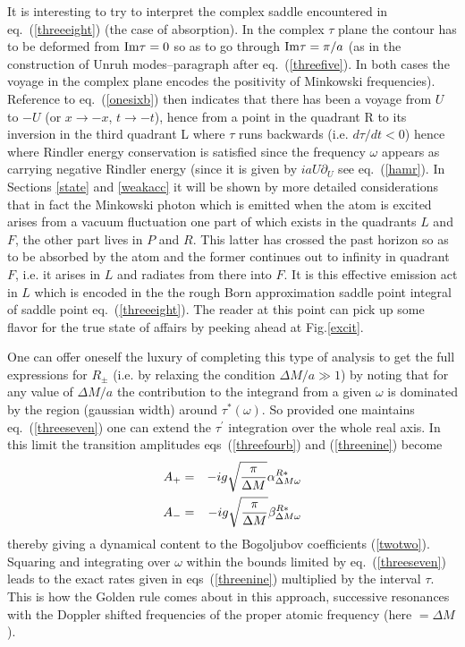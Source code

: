 \documentclass[12pt,oneside]{report}
\def\om{\omega	}
\begin{document}
It is interesting to try to interpret the complex saddle encountered in
eq.~(\ref{threeeight}) (the case of absorption).  In
the complex $\tau$ plane the contour has to be deformed from ${\rm Im} \tau =0$
so as to go through ${\rm Im} \tau =\pi / a$ (as in the construction of Unruh
modes--paragraph after eq.~(\ref{threefive}). In both cases the voyage in
the complex plane encodes the positivity of Minkowski frequencies). Reference to
eq.~(\ref{onesixb}) then indicates that there has been a voyage from $U$ to
$-U$ (or $x\to -x$, $t\to -t$), hence from a point in the quadrant R to its
inversion in the third quadrant L where $\tau$ runs backwards (i.e. 
$d\tau / dt < 0$) hence where Rindler energy conservation is satisfied
since the frequency $\om$ appears as carrying negative Rindler energy
(since it is given by $i aU \partial_U$ see eq.~(\ref{hamr}). 
In  Sections \ref{state} and \ref{weakacc}
it will be shown by more detailed considerations that in fact the Minkowski
photon which is emitted when the atom is excited arises from a vacuum
fluctuation one part of which exists in the quadrants $L$ and $F$, the other
part lives in $P$ and $R$. This latter has crossed the past horizon so as to be
absorbed by the atom and the former continues out to infinity in quadrant $F$,
i.e. it arises in $L$ and radiates from there into $F$. It is this effective
emission act in $L$ which is encoded in the the rough Born approximation saddle
point integral of saddle point eq.~(\ref{threeeight}). The reader at this point
can pick up some flavor for the true state of affairs by peeking ahead at
Fig.\ref{excit}.

One  can offer oneself the luxury of completing this type of analysis to get the
full expressions for $R_\pm$ (i.e. by relaxing the condition 
$\Delta M/ a \gg  1$) 
by noting that for any value of $\Delta M / a$ the
contribution to the integrand from a given $\om$ is dominated by the region
(gaussian width) around $\tau^*(\om)$. So provided 
one maintains eq.~(\ref{threeseven})
one can extend the $\tau^\prime$ integration over the whole real
axis. 
In this limit the transition amplitudes eqs~(\ref{threefourb}) and
(\ref{threenine})
 become 
\begin{eqnarray}
A_+ &=& -ig \sqrt{{\pi\over \Delta M}} \alpha_{\Delta M \omega}^{R *}\nonumber\\
A_- &=& -ig
\sqrt{{\pi\over \Delta M}} \beta_{\Delta M \omega}^{R *}
\label{extrab}\end{eqnarray}
thereby giving a dynamical
content to the Bogoljubov coefficients (\ref{twotwo}).
Squaring and integrating
over $\om$ within the bounds limited by eq.~(\ref{threeseven}) leads to
the exact rates given in eqs~(\ref{threenine}) multiplied by the interval
$\tau$. This 
is how the Golden rule comes about in this
approach, successive resonances with the Doppler shifted frequencies of
the proper atomic frequency (here $= \Delta M$).
\end{document}
